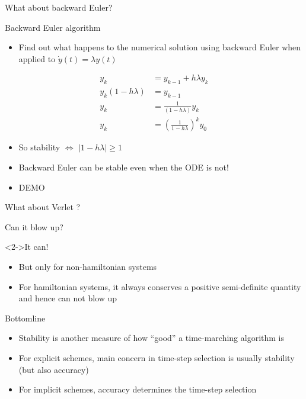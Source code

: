 \documentclass[presentation]{beamer}
\newcommand{\abs}[1]{\left\lvert#1\right\rvert}
\begin{document}
\begin{frame}[label={sec:org42cc457}]{What about backward Euler?}
\begin{block}{Backward Euler algorithm}
\begin{itemize}
\item Find out what happens to the numerical solution using backward Euler when applied to
\(\dot{y}(t) = \lambda y(t)\)
\end{itemize}
\begin{equation*}
\begin{aligned} y_k & = y_{k-1} + h \lambda y_{k} \\
y_k (1 - h \lambda) &= y_{k-1} \\
y_k &= \frac{1}{(1 - h \lambda)}y_{k} \\
y_k &= \left( \frac{1}{1 - h \lambda} \right)^k y_{0}
\end{aligned}
\end{equation*}
\begin{itemize}
\item So stability \(\Leftrightarrow\) \(\abs{1 - h \lambda} \geq 1\)
\item Backward Euler can be stable even when the ODE is not!
\item \alert{DEMO}
\end{itemize}
\end{block}
\end{frame}
\begin{frame}[label={sec:org6df1e31}]{What about Verlet ?}
\begin{block}{Can it blow up?}
\end{block}
\begin{block}<2->{It can!}
\begin{itemize}
\item But only for non-hamiltonian systems
\item For hamiltonian systems, it always conserves a positive semi-definite
quantity and hence can not blow up
\end{itemize}
\end{block}
\end{frame}
\begin{frame}[label={sec:orgde7a3f2}]{Bottomline}
\begin{itemize}
\item Stability is another measure of how ``good'' a time-marching algorithm is
\item For \alert{explicit} schemes, main concern in time-step selection is usually
\alert{stability} (but also accuracy)
\item For \alert{implicit} schemes, \alert{accuracy} determines the time-step selection
\end{itemize}
\end{frame}
\end{document}
